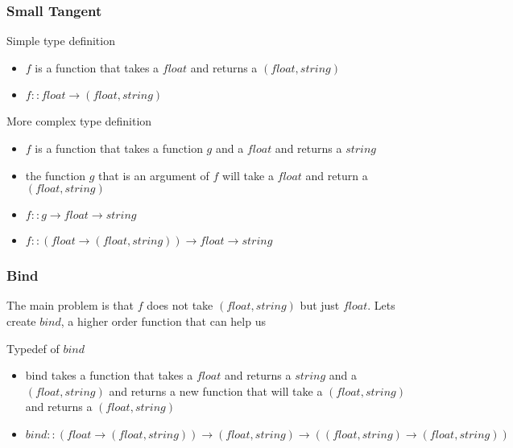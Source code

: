 \begin{frame}[fragile]
    \frametitle{Small Tangent}
    \begin{block}{Simple type definition}
        \begin{itemize}
            \item $f$ is a function that takes a $float$ and returns a $(float, string)$
            \item $f :: float \rightarrow (float, string)$
        \end{itemize}
    \end{block}
    \begin{block}{More complex type definition}
        \begin{itemize}
            \item $f$ is a function that takes a function $g$ and a $float$ and returns a $string$
            \item the function $g$ that is an argument of $f$ will take a $float$ and return a $(float, string)$
            \item $f :: g \rightarrow float \rightarrow string$
            \item $f :: (float \rightarrow (float, string)) \rightarrow float \rightarrow string$
        \end{itemize}
    \end{block}
\end{frame}

\begin{frame}[fragile]
    \frametitle{Bind}
    \begin{block}{}
        The main problem is that $f$ does not take $(float, string)$ but just $float$. Lets create $bind$, a higher
        order function that can help us
    \end{block}
    \begin{block}{Typedef of $bind$}
        \begin{itemize}
            \item bind takes a function that takes a $float$ and returns a $string$ and a $(float, string)$ and returns
            a new function that will take a $(float, string)$ and returns a $(float, string)$
            \item $bind :: (float \rightarrow (float, string)) \rightarrow (float, string) \rightarrow ((float, string) \rightarrow (float, string))$
        \end{itemize}
    \end{block}
\end{frame}

